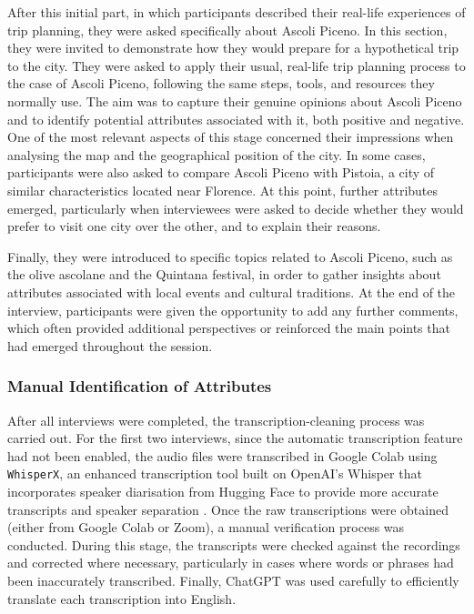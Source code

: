 \documentclass[a4paper, 12pt, twoside]{report}  %
\begin{document}
\indent After this initial part, in which participants described their real-life experiences of trip planning, they were asked specifically about Ascoli Piceno. In this section, they were invited to demonstrate how they would prepare for a hypothetical trip to the city. They were asked to apply their usual, real-life trip planning process to the case of Ascoli Piceno, following the same steps, tools, and resources they normally use. The aim was to capture their genuine opinions about Ascoli Piceno and to identify potential attributes associated with it, both positive and negative. One of the most relevant aspects of this stage concerned their impressions when analysing the map and the geographical position of the city. In some cases, participants were also asked to compare Ascoli Piceno with Pistoia, a city of similar characteristics located near Florence. At this point, further attributes emerged, particularly when interviewees were asked to decide whether they would prefer to visit one city over the other, and to explain their reasons.

\indent Finally, they were introduced to specific topics related to Ascoli Piceno, such as the olive ascolane and the Quintana festival, in order to gather insights about attributes associated with local events and cultural traditions. At the end of the interview, participants were given the opportunity to add any further comments, which often provided additional perspectives or reinforced the main points that had emerged throughout the session.

\subsubsection{Manual Identification of Attributes}

\indent After all interviews were completed, the transcription-cleaning process was carried out. For the first two interviews, since the automatic transcription feature had not been enabled, the audio files were transcribed in Google Colab using \texttt{WhisperX}, an enhanced transcription tool built on OpenAI’s Whisper that incorporates speaker diarisation from Hugging Face to provide more accurate transcripts and speaker separation \cite{whisperx}. Once the raw transcriptions were obtained (either from Google Colab or Zoom), a manual verification process was conducted. During this stage, the transcripts were checked against the recordings and corrected where necessary, particularly in cases where words or phrases had been inaccurately transcribed. Finally, ChatGPT was used carefully to efficiently translate each transcription into English.
\end{document}
